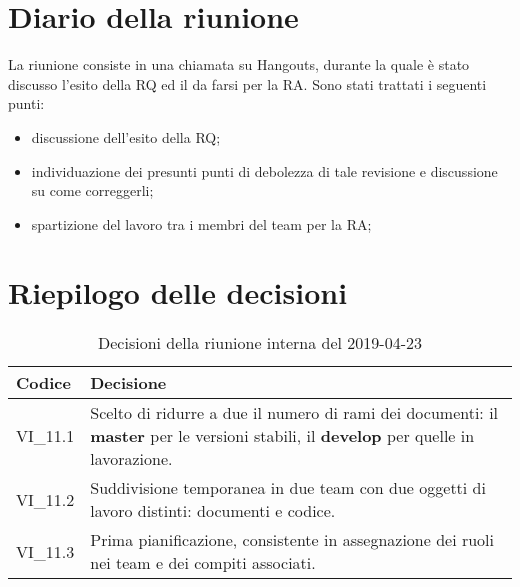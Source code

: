 \section{Diario della riunione}
La riunione consiste in una chiamata su Hangouts, durante la quale è stato 
discusso l'esito della RQ ed il da farsi per la RA.
Sono stati trattati i seguenti punti:
\begin{itemize}
	\item discussione dell'esito della RQ;
	\item individuazione dei presunti punti di debolezza di tale revisione e discussione su come correggerli;
	\item spartizione del lavoro tra i membri del team per la RA;
	
\end{itemize}

\hspace{3cm}

\section{Riepilogo delle decisioni}

	
	\begin{longtable}{ >{\centering}p{} >{}p{}}
		\caption{Decisioni della riunione interna del 2019-04-23}\\	
		\rowcolorhead
		\textbf{\color{white}Codice} 
		& \centering\textbf{\color{white}Decisione} 
		\tabularnewline 
		\endfirsthead
		VI\_11.1 & Scelto di ridurre a due il numero di rami dei documenti: il \textbf{master} per le versioni stabili, il \textbf{develop} per quelle in lavorazione.
		\tabularnewline 
		VI\_11.2 & Suddivisione temporanea in due team con due oggetti di lavoro distinti: documenti e codice.
		\tabularnewline 
		VI\_11.3 & Prima pianificazione, consistente in assegnazione dei ruoli nei team e dei compiti associati.
		
	\end{longtable}
	




